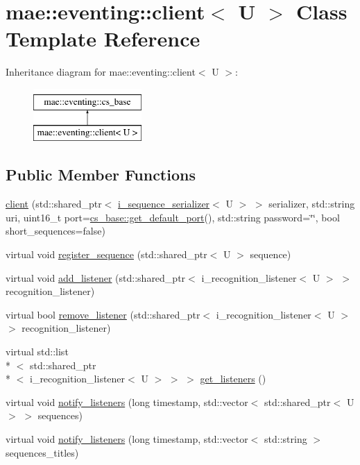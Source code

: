 \hypertarget{classmae_1_1eventing_1_1client}{\section{mae\-:\-:eventing\-:\-:client$<$ U $>$ Class Template Reference}
\label{classmae_1_1eventing_1_1client}
}
Inheritance diagram for mae\-:\-:eventing\-:\-:client$<$ U $>$\-:\begin{figure}[H]
\begin{center}
\leavevmode
\includegraphics[height=2.000000cm]{classmae_1_1eventing_1_1client}
\end{center}
\end{figure}
\subsection*{Public Member Functions}
\begin{DoxyCompactItemize}
\item 
\hyperlink{classmae_1_1eventing_1_1client_a373432ccb417f31d7e9d63bd7f85c315}{client} (std\-::shared\-\_\-ptr$<$ \hyperlink{classmae_1_1eventing_1_1i__sequence__serializer}{i\-\_\-sequence\-\_\-serializer}$<$ U $>$ $>$ serializer, std\-::string uri, uint16\-\_\-t port=\hyperlink{classmae_1_1eventing_1_1cs__base_a5c068f50b548ec7299133976c00fa5a4}{cs\-\_\-base\-::get\-\_\-default\-\_\-port}(), std\-::string password=\char`\"{}\char`\"{}, bool short\-\_\-sequences=false)
\item 
virtual void \hyperlink{classmae_1_1eventing_1_1client_a8d6b202397c1f209a7eb06f0270e26e7}{register\-\_\-sequence} (std\-::shared\-\_\-ptr$<$ U $>$ sequence)
\item 
virtual void \hyperlink{classmae_1_1eventing_1_1client_a386bcfe7d090b991ed4949856b092a67}{add\-\_\-listener} (std\-::shared\-\_\-ptr$<$ i\-\_\-recognition\-\_\-listener$<$ U $>$ $>$ recognition\-\_\-listener)
\item 
virtual bool \hyperlink{classmae_1_1eventing_1_1client_a929df1715e36580d2233413c2ea3224a}{remove\-\_\-listener} (std\-::shared\-\_\-ptr$<$ i\-\_\-recognition\-\_\-listener$<$ U $>$ $>$ recognition\-\_\-listener)
\item 
virtual std\-::list\\*
$<$ std\-::shared\-\_\-ptr\\*
$<$ i\-\_\-recognition\-\_\-listener$<$ U $>$ $>$ $>$ \hyperlink{classmae_1_1eventing_1_1client_a89ba2ddd24cda5f89efdea85ce01c82d}{get\-\_\-listeners} ()
\item 
virtual void \hyperlink{classmae_1_1eventing_1_1client_a787a1fb0b964d99676ce2a1da0a0c4fe}{notify\-\_\-listeners} (long timestamp, std\-::vector$<$ std\-::shared\-\_\-ptr$<$ U $>$ $>$ sequences)
\item 
virtual void \hyperlink{classmae_1_1eventing_1_1client_a46e28e540f0d823059268e1a275afe0e}{notify\-\_\-listeners} (long timestamp, std\-::vector$<$ std\-::string $>$ sequences\-\_\-titles)
\end{DoxyCompactItemize}
